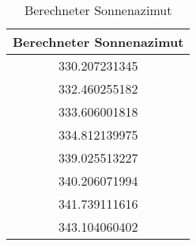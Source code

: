 \begin{table}[h!]
\centering
\begin{tabular}{c}
Berechneter Sonnenazimut \\
\hline
330.207231345\\
332.460255182\\
333.606001818\\
334.812139975\\
339.025513227\\
340.206071994\\
341.739111616\\
343.104060402\\
\end{tabular}
\caption{Berechneter Sonnenazimut}
\label{sonnenaz}
\end{table}
